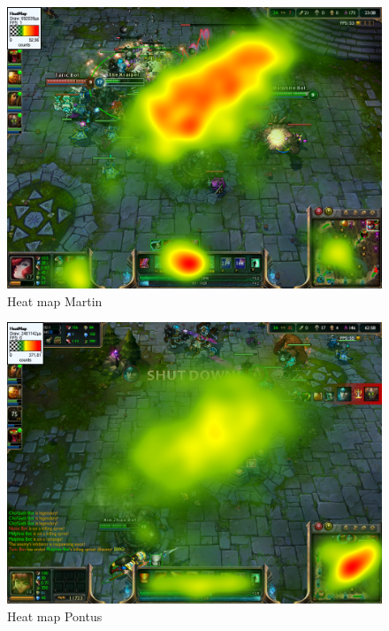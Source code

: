 \documentclass{article}
\begin{document}
\begin{figure}[h!]
\begin{center}
\includegraphics*[width=0.90\columnwidth]{images/heatmap/Martin}
\end{center}
\caption{Heat map Martin}
\label{heat_mar}
\end{figure}

\begin{figure}[h!]
\begin{center}
\includegraphics*[width=0.90\columnwidth]{images/heatmap/Pontus}
\end{center}
\caption{Heat map Pontus}
\label{heat_pon}
\end{figure}
\end{document}
